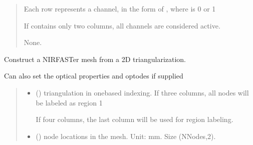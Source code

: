 \documentclass[letterpaper,10pt,english]{sphinxmanual}
\begin{document}
\begin{fulllineitems}
\begin{fulllineitems}
\begin{quote}
\begin{description}
\begin{itemize}
\sphinxAtStartPar
Each row represents a channel, in the form of , where  is 0 or 1

\sphinxAtStartPar
If  contains only two columns, all channels are considered active.


\end{itemize}

\sphinxAtStartPar
None.

\end{description}\end{quote}

\end{fulllineitems}


\begin{fulllineitems}
\label{\detokenize{_autosummary/nirfasterff.base.stnd_mesh.stndmesh:nirfasterff.base.stnd_mesh.stndmesh.from_triangle}}
\pysigstartsignatures
\pysiglinewithargsret
{}
{\sphinxparamcomma {}\sphinxparamcomma {}\sphinxparamcomma {}\sphinxparamcomma {}\sphinxparamcomma {}}
{}
\pysigstopsignatures
\sphinxAtStartPar
Construct a NIRFASTer mesh from a 2D triangularization.

\sphinxAtStartPar
Can also set the optical properties and optodes if supplied
\begin{quote}\begin{description}
\begin{itemize}
\item {} 
\sphinxAtStartPar
{} () \textendash{} 
\sphinxAtStartPar
triangulation in one\sphinxhyphen{}based indexing. If three columns, all nodes will be labeled as region 1

\sphinxAtStartPar
If four columns, the last column will be used for region labeling.


\item {} 
\sphinxAtStartPar
{} () \textendash{} node locations in the mesh. Unit: mm. Size (NNodes,2).


\end{itemize}
\end{description}
\end{quote}
\end{fulllineitems}
\end{fulllineitems}
\end{document}

